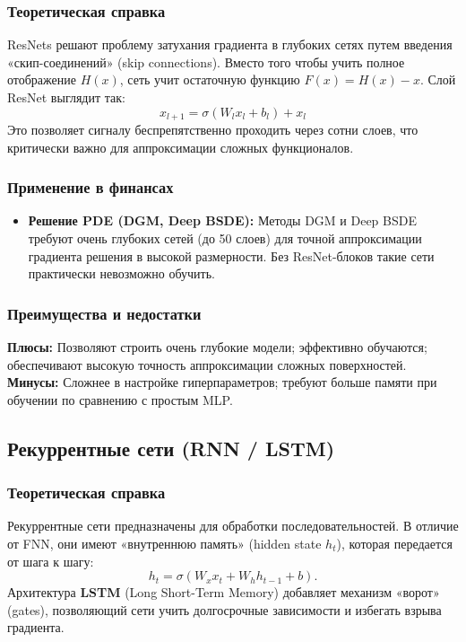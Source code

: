 \documentclass[12pt, a4paper]{article}
\begin{document}
\subsubsection{Теоретическая справка}
ResNets решают проблему затухания градиента в глубоких сетях путем введения «скип-соединений» (skip connections). Вместо того чтобы учить полное отображение $H(x)$, сеть учит остаточную функцию $F(x) = H(x) - x$. Слой ResNet выглядит так:
\begin{equation}
    x_{l+1} = \sigma \left( W_l x_l + b_l \right) + x_l
\end{equation}
Это позволяет сигналу беспрепятственно проходить через сотни слоев, что критически важно для аппроксимации сложных функционалов.

\subsubsection{Применение в финансах}
\begin{itemize}
    \item \textbf{Решение PDE (DGM, Deep BSDE):} Методы DGM \cite{Sirignano2018} и Deep BSDE \cite{Han2018} требуют очень глубоких сетей (до 50 слоев) для точной аппроксимации градиента решения в высокой размерности. Без ResNet-блоков такие сети практически невозможно обучить.
\end{itemize}

\subsubsection{Преимущества и недостатки}
\textbf{Плюсы:} Позволяют строить очень глубокие модели; эффективно обучаются; обеспечивают высокую точность аппроксимации сложных поверхностей. \\
\textbf{Минусы:} Сложнее в настройке гиперпараметров; требуют больше памяти при обучении по сравнению с простым MLP.

\subsection{Рекуррентные сети (RNN / LSTM)}

\subsubsection{Теоретическая справка}
Рекуррентные сети предназначены для обработки последовательностей. В отличие от FNN, они имеют «внутреннюю память» (hidden state $h_t$), которая передается от шага к шагу:
\begin{equation}
    h_t = \sigma(W_x x_t + W_h h_{t-1} + b).
\end{equation}
Архитектура \textbf{LSTM} (Long Short-Term Memory) добавляет механизм «ворот» (gates), позволяющий сети учить долгосрочные зависимости и избегать взрыва градиента.
\end{document}
